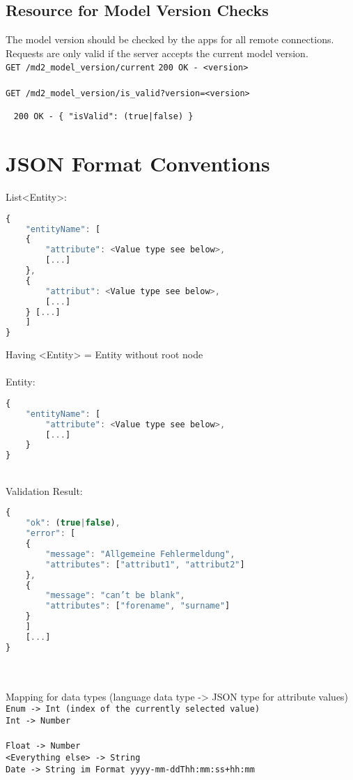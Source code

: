 \subsection*{Resource for Model Version Checks}
The model version should be checked by the apps for all remote connections. Requests are only valid if the server accepts the current model version. \\
\lstinline|GET /md2_model_version/current| \hfill \lstinline|200 OK - <version>| \\
\\
\lstinline|GET /md2_model_version/is_valid?version=<version>| 

~ \hfill \lstinline!200 OK - { "isValid": (true|false) }!


\section{JSON Format Conventions}
List<Entity>:
\begin{lstlisting}[language=Javascript]
{
	"entityName": [
	{
		"attribute": <Value type see below>,
		[...]
	},
	{
		"attribut": <Value type see below>,
		[...]
	} [...]
	]
}
\end{lstlisting}
Having <Entity> = Entity without root node
\\
\\
Entity:
\begin{lstlisting}[language=Javascript]
{
	"entityName": [
		"attribute": <Value type see below>,
		[...]
	}
}
\end{lstlisting}
~
\\
Validation Result:
\begin{lstlisting}[language=Javascript]
{
	"ok": (true|false),
	"error": [
	{
		"message": "Allgemeine Fehlermeldung",
		"attributes": ["attribut1", "attribut2"]
	},
	{
		"message": "can’t be blank",
		"attributes": ["forename", "surname"]
	}
	]
	[...]
}
\end{lstlisting}
~
\\ \\
Mapping for data types (language data type -> JSON type for attribute values) \\
\lstinline|Enum -> Int (index of the currently selected value)| \\
\lstinline|Int -> Number|	
\\ \\
\lstinline|Float -> Number| \\
\lstinline|<Everything else> -> String| \\
\lstinline|Date -> String im Format yyyy-mm-ddThh:mm:ss+hh:mm| \\


